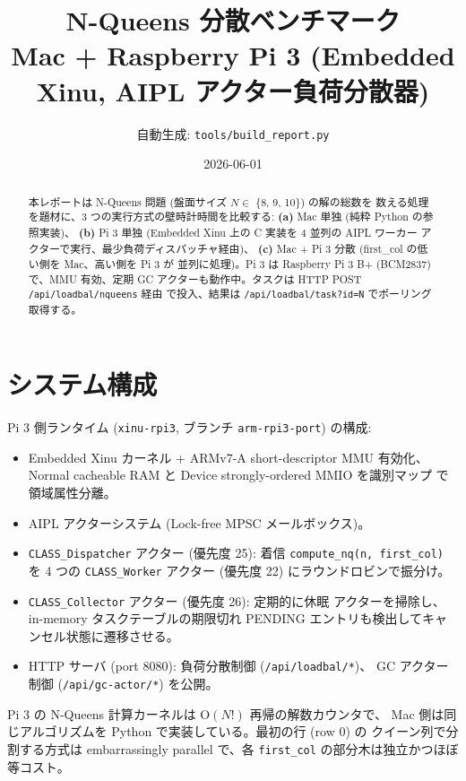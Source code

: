 \documentclass[a4paper,11pt]{ltjsarticle}
\title{N-Queens 分散ベンチマーク \\
  \large Mac + Raspberry Pi 3 (Embedded Xinu, AIPL アクター負荷分散器)}
\author{自動生成: \texttt{tools/build\_report.py}}
\date{2026-06-01}
\begin{document}
\maketitle

\begin{abstract}
本レポートは N-Queens 問題 (盤面サイズ $N \in$ \{8, 9, 10\}) の解の総数を
数える処理を題材に、3 つの実行方式の壁時計時間を比較する:
\textbf{(a)} Mac 単独 (純粋 Python の参照実装)、
\textbf{(b)} Pi 3 単独 (Embedded Xinu 上の C 実装を 4 並列の AIPL ワーカー
アクターで実行、最少負荷ディスパッチャ経由)、
\textbf{(c)} Mac + Pi 3 分散 (first\_col の低い側を Mac、高い側を Pi 3 が
並列に処理)。Pi 3 は Raspberry Pi 3 B+ (BCM2837) で、MMU 有効、定期 GC
アクターも動作中。タスクは HTTP POST \texttt{/api/loadbal/nqueens} 経由
で投入、結果は \texttt{/api/loadbal/task?id=N} でポーリング取得する。
\end{abstract}

\section{システム構成}

Pi 3 側ランタイム (\texttt{xinu-rpi3}, ブランチ \texttt{arm-rpi3-port}) の構成:
\begin{itemize}
  \item Embedded Xinu カーネル + ARMv7-A short-descriptor MMU 有効化、
        Normal cacheable RAM と Device strongly-ordered MMIO を識別マップ
        で領域属性分離。
  \item AIPL アクターシステム (Lock-free MPSC メールボックス)。
  \item \texttt{CLASS\_Dispatcher} アクター (優先度 25): 着信
        \texttt{compute\_nq(n, first\_col)} を 4 つの
        \texttt{CLASS\_Worker} アクター (優先度 22) にラウンドロビンで振分け。
  \item \texttt{CLASS\_Collector} アクター (優先度 26): 定期的に休眠
        アクターを掃除し、in-memory タスクテーブルの期限切れ PENDING
        エントリも検出してキャンセル状態に遷移させる。
  \item HTTP サーバ (port 8080): 負荷分散制御 (\texttt{/api/loadbal/*})、
        GC アクター制御 (\texttt{/api/gc-actor/*}) を公開。
\end{itemize}

Pi 3 の N-Queens 計算カーネルは $\mathrm{O}(N!)$ 再帰の解数カウンタで、
Mac 側は同じアルゴリズムを Python で実装している。最初の行 (row 0) の
クイーン列で分割する方式は embarrassingly parallel で、各 \texttt{first\_col}
の部分木は独立かつほぼ等コスト。
\end{document}
